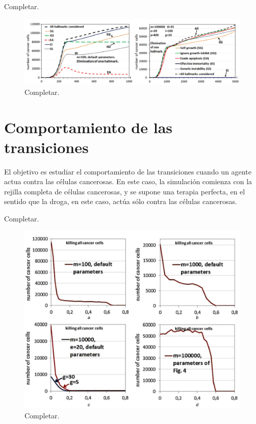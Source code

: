 Completar.

\begin{figure}[h]
\centering
\includegraphics[scale=0.5]{figures/experiments/exp6}
\caption{Completar.}
\end{figure}

\section{Comportamiento de las transiciones}

El objetivo es estudiar el comportamiento de las transiciones cuando un agente actua contra las células cancerosas.
En este caso, la simulación comienza con la rejilla completa de células cancerosas, y se supone una terapia
perfecta, en el sentido que la droga, en este caso, actúa sólo contra las células cancerosas.

Completar.

\begin{figure}[h]
\centering
\includegraphics[scale=0.7]{figures/experiments/exp7}
\caption{Completar.}
\end{figure}

